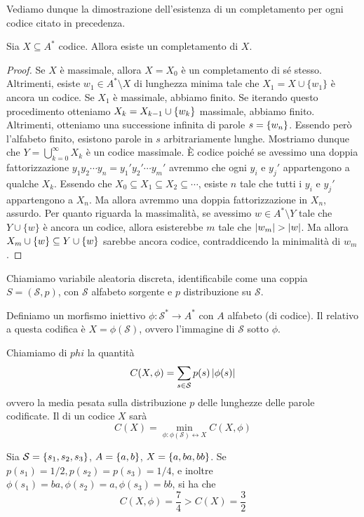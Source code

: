 Vediamo dunque la dimostrazione dell'esistenza di un completamento per ogni codice citato in precedenza.
\begin{proposition}
  Sia \(X \subseteq A^*\) codice. Allora esiste un completamento di \(X\).
\end{proposition}
\begin{proof}
  Se \(X\) è massimale, allora \(X = X_0\) è un completamento di sé stesso.
  Altrimenti, esiste \(w_1 \in A^*\setminus X\) di lunghezza minima tale che \(X_1 = X \cup \{w_1\}\) è ancora un codice.
  Se \(X_1\) è massimale, abbiamo finito.
  Se iterando questo procedimento otteniamo \(X_k = X_{k-1} \cup \set{w_k}\) massimale, abbiamo finito.
  Altrimenti, otteniamo una successione infinita di parole \(s = \set{w_n}\). Essendo però l'alfabeto finito, esistono parole in \(s\) arbitrariamente lunghe.
  Mostriamo dunque che \(Y = \bigcup_{k = 0}^{\infty} X_k\) è un codice massimale.
  È codice poiché se avessimo una doppia fattorizzazione \(y_1 y_2 \cdots y_n = y_1' y_2' \cdots y_m'\) avremmo che ogni \(y_i\) e \(y_j'\) appartengono a qualche \(X_k\). Essendo che \(X_0 \subseteq X_1 \subseteq X_2 \subseteq \cdots\), esiste \(n\) tale che tutti i \(y_i\) e \(y_j'\) appartengono a \(X_n\). Ma allora avremmo una doppia fattorizzazione in \(X_n\), assurdo.
  Per quanto riguarda la massimalità, se avessimo \(w \in A^* \setminus Y\) tale che \(Y \cup \{w\}\) è ancora un codice, allora esisterebbe \(m\) tale che \(\left|w_m\right| > \left|w\right|\).
  Ma allora \(X_m \cup \set{w}\subseteq Y \cup \set{w}\) sarebbe ancora codice, contraddicendo la minimalità di \(w_m\).
\end{proof}

\begin{definition}
  Chiamiamo  variabile aleatoria discreta, identificabile come una coppia \(S = (\mathcal{S},p)\), con \(\mathcal{S}\) alfabeto sorgente e \(p\) distribuzione su \(\mathcal{S}\).
\end{definition}
\begin{definition}[Codifica]
  Definiamo  un morfismo iniettivo \(\phi: \mathcal{S}^* \to A^*\) con \(A\) alfabeto (di codice).
  Il  relativo a questa codifica è \(X = \phi(\mathcal{S})\), ovvero l'immagine di \(\mathcal{S}\) sotto \(\phi\).
\end{definition}
\begin{definition}
  Chiamiamo  di \(phi\) la quantità
  \[C(X,\phi) = \sum_{s \in \mathcal{S}} p(s) \left|\phi(s)\right|\]
  ovvero la media pesata sulla distribuzione \(p\) delle lunghezze delle parole codificate.
  Il  di un codice \(X\) sarà
  \[C(X) = \min_{\phi: \phi(\mathcal{S}) \leftrightarrow  X} C(X,\phi)\]
\end{definition}

\begin{example}
  Sia \(\mathcal{S} = \set{s_1,s_2,s_3}\), \(A = \set{a,b}\), \(X = \set{a,ba,bb}\).
  Se \(p(s_1) = 1/2, p(s_2) = p(s_3) = 1/4\), e inoltre \(\phi(s_1) = ba, \phi(s_2) = a, \phi(s_3) = bb\), si ha che
    \[C(X,\phi) = \frac{7}{4} > C(X) = \frac{3}{2}\]
\end{example}